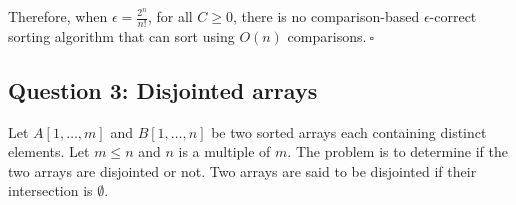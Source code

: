 \begin{enumerate}[resume]
\begin{solution}
Therefore, when $\epsilon=\frac{2^n}{n!}$, for all $C\geq 0$, there is no comparison-based $\epsilon$-correct sorting algorithm that can sort using $O(n)$ comparisons.$~\square$
\end{solution}
\end{enumerate}



\subsection*{Question 3: Disjointed arrays}
Let $A[1,\ldots,m]$ and $B[1,\ldots,n]$ be two sorted
arrays each containing distinct elements. Let
$m\leq n$ and $n$ is a multiple of $m$. 
The problem is to determine if the two arrays
are disjointed or not. Two arrays are said
to be disjointed if their intersection is
$\emptyset$. 

